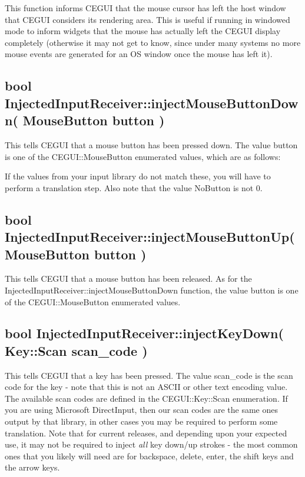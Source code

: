 This function informs C\+E\+G\+UI that the mouse cursor has left the host window that C\+E\+G\+UI considers it\textquotesingle{}s rendering area. This is useful if running in windowed mode to inform widgets that the mouse has actually left the C\+E\+G\+UI display completely (otherwise it may not get to know, since under many systems no more mouse events are generated for an OS window once the mouse has left it).\hypertarget{input_tutorial_input_tutorial_mbdown}{}\subsection{bool Injected\+Input\+Receiver\+::inject\+Mouse\+Button\+Down( Mouse\+Button button )}\label{input_tutorial_input_tutorial_mbdown}
This tells C\+E\+G\+UI that a mouse button has been pressed down. The value {\ttfamily button} is one of the C\+E\+G\+U\+I\+::\+Mouse\+Button enumerated values, which are as follows\+: 
\begin{DoxyCode}{0}
\DoxyCodeLine{\{}
\DoxyCodeLine{\};}
\end{DoxyCode}


If the values from your input library do not match these, you will have to perform a translation step. Also note that the value No\+Button is not 0.\hypertarget{input_tutorial_input_tutorial_mbup}{}\subsection{bool Injected\+Input\+Receiver\+::inject\+Mouse\+Button\+Up( Mouse\+Button button )}\label{input_tutorial_input_tutorial_mbup}
This tells C\+E\+G\+UI that a mouse button has been released. As for the Injected\+Input\+Receiver\+::inject\+Mouse\+Button\+Down function, the value {\ttfamily button} is one of the C\+E\+G\+U\+I\+::\+Mouse\+Button enumerated values.\hypertarget{input_tutorial_input_tutorial_keydown}{}\subsection{bool Injected\+Input\+Receiver\+::inject\+Key\+Down( Key\+::\+Scan scan\+\_\+code )}\label{input_tutorial_input_tutorial_keydown}
This tells C\+E\+G\+UI that a key has been pressed. The value {\ttfamily scan\+\_\+code} is the scan code for the key -\/ note that this is not an A\+S\+C\+II or other text encoding value. The available scan codes are defined in the C\+E\+G\+U\+I\+::\+Key\+::\+Scan enumeration. If you are using Microsoft Direct\+Input, then our scan codes are the same ones output by that library, in other cases you may be required to perform some translation. Note that for current releases, and depending upon your expected use, it may not be required to inject {\itshape all} key down/up strokes -\/ the most common ones that you likely will need are for backspace, delete, enter, the shift keys and the arrow keys.

